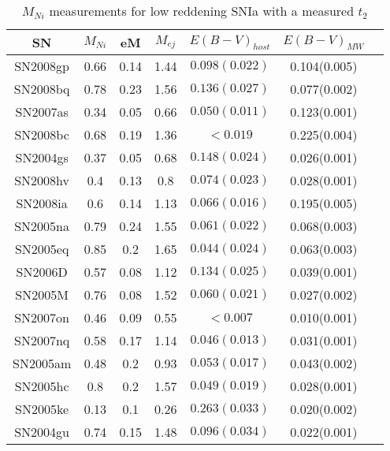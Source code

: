 \begin{table*}
\caption{$M_{Ni}$ measurements for low reddening SNIa with a measured $t_2$}
\begin{tabular}{ccccccc}
\hline
SN  & $M_{Ni}$ & eM & $M_{ej}$ & $E(B-V)_{host}$ & $E(B-V)_{MW}$ & \\
\hline
SN2008gp	&	0.66	&	0.14	&	1.44	&	$0.098(0.022)$	&	0.104(0.005)	&	\\
SN2008bq	&	0.78	&	0.23	&	1.56	&	$0.136(0.027)$	&	0.077(0.002)	&	\\
SN2007as	&	0.34	&	0.05	&	0.66	&	$0.050(0.011)$	&	0.123(0.001)	&	\\
SN2008bc	&	0.68	&	0.19	&	1.36	&	$<0.019$	&	0.225(0.004)	&	\\
SN2004gs	&	0.37	&	0.05	&	0.68	&	$0.148(0.024)$	&	0.026(0.001)	&	\\
SN2008hv	&	0.4	&	0.13	&	0.8	&	$0.074(0.023)$	&	0.028(0.001)	&	\\
SN2008ia	&	0.6	&	0.14	&	1.13	&	$0.066(0.016)$	&	0.195(0.005)	&	\\
SN2005na	&	0.79	&	0.24	&	1.55	&	$0.061(0.022)$	&	0.068(0.003)	&	\\
SN2005eq	&	0.85	&	0.2	&	1.65	&	$0.044(0.024)$	&	0.063(0.003)	&	\\
SN2006D	&	0.57	&	0.08	&	1.12	&	$0.134(0.025)$	&	0.039(0.001)	&	\\
SN2005M	&	0.76	&	0.08	&	1.52	&	$0.060(0.021)$	&	0.027(0.002)	&	\\
SN2007on	&	0.46	&	0.09	&	0.55	&	$<0.007$	&	0.010(0.001)	&	\\
SN2007nq	&	0.58	&	0.17	&	1.14	&	$0.046(0.013)$	&	0.031(0.001)	&	\\
SN2005am	&	0.48	&	0.2	&	0.93	&	$0.053(0.017)$	&	0.043(0.002)	&	\\
SN2005hc	&	0.8	&	0.2	&	1.57	&	$0.049(0.019)$	&	0.028(0.001)	&	\\
SN2005ke	&	0.13	&	0.1	&	0.26	&	$0.263(0.033)$	&	0.020(0.002)	&	\\
SN2004gu	&	0.74	&	0.15	&	1.48	&	$0.096(0.034)$	&	0.022(0.001)	&	\\
\hline
\end{tabular}
\label{tab:mni}
\end{table*}
